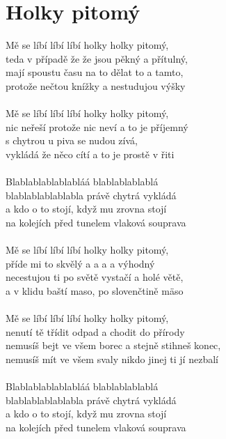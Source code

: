 \section{Holky pitomý}
Mě se líbí líbí líbí holky holky pitomý,\\
teda v případě že že jsou pěkný a přítulný,\\
mají spoustu času na to dělat to a tamto,\\
protože nečtou knížky a nestudujou výšky\\
\\
Mě se líbí líbí líbí holky holky pitomý,\\
nic neřeší protože nic neví a to je příjemný\\
s chytrou u piva se nudou zívá,\\
vykládá že něco cítí a to je prostě v řiti\\
\\
Blablablablablabláá blablablablablá\\
blablablablablabla právě chytrá vykládá\\
a kdo o to stojí, když mu zrovna stojí\\
na kolejích před tunelem vlaková souprava \\
\\
Mě se líbí líbí líbí holky holky pitomý,\\
příde mi to skvělý a a a a výhodný\\
necestujou ti po světě vystačí a holé větě,\\
a v klidu baští maso, po slovenčtině mäso\\
\\
Mě se líbí líbí líbí holky holky pitomý,\\
nenutí tě třídit odpad a chodit do přírody\\
nemusíš bejt ve všem borec a stejně stihneš konec,\\
nemusíš mít ve všem svaly nikdo jinej ti jí nezbalí\\
\\
Blablablablablabláá blablablablablá\\
blablablablablabla právě chytrá vykládá\\
a kdo o to stojí, když mu zrovna stojí\\
na kolejích před tunelem vlaková souprava \\

